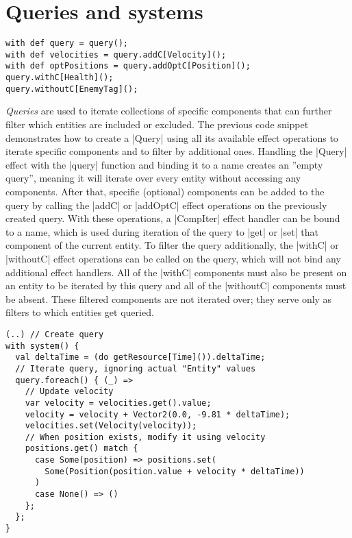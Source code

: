 \section{Queries and systems}\label{sec:queries}

\begin{lstlisting}[caption=Query creation example]
with def query = query();
with def velocities = query.addC[Velocity]();
with def optPositions = query.addOptC[Position]();
query.withC[Health]();
query.withoutC[EnemyTag]();
\end{lstlisting}

\textit{Queries} are used to iterate collections of specific components that can further filter which entities are included or excluded. The previous code snippet demonstrates how to create a |Query| using all its available effect operations to iterate specific components and to filter by additional ones. Handling the |Query| effect with the |query| function and binding it to a name creates an ''empty query'', meaning it will iterate over every entity without accessing any components. After that, specific (optional) components can be added to the query by calling the |addC| or |addOptC| effect operations on the previously created query. With these operations, a |CompIter| effect handler can be bound to a name, which is used during iteration of the query to |get| or |set| that component of the current entity. To filter the query additionally, the |withC| or |withoutC| effect operations can be called on the query, which will not bind any additional effect handlers. All of the |withC| components must also be present on an entity to be iterated by this query and all of the |withoutC| components must be absent. These filtered components are not iterated over; they serve only as filters to which entities get queried.

\begin{lstlisting}[caption=System example for gravity]
(..) // Create query
with system() {
  val deltaTime = (do getResource[Time]()).deltaTime;
  // Iterate query, ignoring actual "Entity" values
  query.foreach() { (_) =>
    // Update velocity
    var velocity = velocities.get().value;
    velocity = velocity + Vector2(0.0, -9.81 * deltaTime);
    velocities.set(Velocity(velocity));
    // When position exists, modify it using velocity
    positions.get() match {
      case Some(position) => positions.set(
        Some(Position(position.value + velocity * deltaTime))
      )
      case None() => ()
    };
  };
}
\end{lstlisting}

